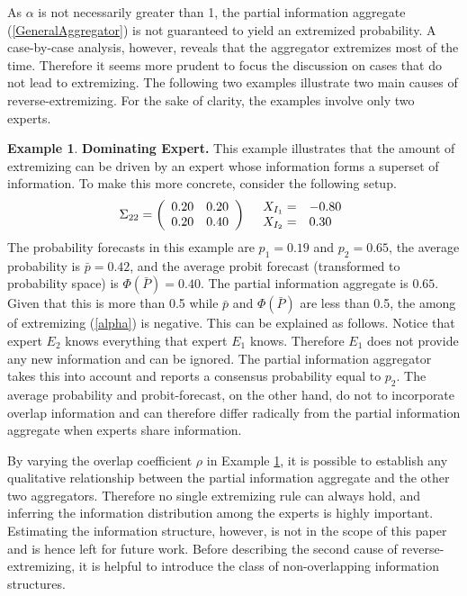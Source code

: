 \documentclass[11pt]{article}
\theoremstyle{definition}
\newtheorem{example}[theorem]{Example}
\theoremstyle{definition}
\begin{document}
As $\alpha$ is not necessarily greater than 1, the partial information aggregate (\ref{GeneralAggregator}) is not guaranteed to yield an extremized probability. A case-by-case analysis, however, reveals that the aggregator extremizes most of the time. Therefore it seems more prudent to focus the discussion on cases that do not lead to extremizing. The following two examples illustrate two main causes of reverse-extremizing. For the sake of clarity, the examples involve only two experts. 



\begin{example}
\label{Example1}
\textbf{Dominating Expert.} This example illustrates that the amount of extremizing can be driven by an expert whose information forms a superset of information. To make this more concrete, consider the following setup.
\begin{align*}
\Sigma_{22} =  \left(\begin{array}{c c}
0.20 & 0.20\\
0.20 & 0.40 \\
 \end{array}\right)
  && 
  \begin{array}{l l}
X_{I_1} =& -0.80\\
X_{I_2} =& 0.30
 \end{array}
\end{align*}
The probability forecasts in this example are $p_1 = 0.19$ and $p_2 = 0.65$, the average probability is $\bar{p} = 0.42$, and the average probit forecast (transformed to probability space) is $\Phi(\bar{P}) = 0.40$. 
The partial information aggregate is $0.65$.  Given that this is more than 0.5 while $\bar{p}$ and $\Phi(\bar{P})$ are less than 0.5, the among of extremizing (\ref{alpha}) is negative. This can be explained as follows. Notice that expert $E_2$ knows everything that expert $E_1$ knows. Therefore $E_1$ does not provide any new information and can be ignored. The partial information aggregator takes this into account and reports a consensus probability equal to $p_2$. The average probability and probit-forecast, on the other hand, do not to incorporate overlap information and can therefore differ radically from the partial information aggregate when experts share information.
\end{example}

By varying the overlap coefficient $\rho$ in Example \ref{Example1}, it is possible to establish any qualitative relationship between the partial information aggregate and the other two aggregators. Therefore no single extremizing rule can always hold, and inferring the information distribution among the experts is highly important. Estimating the information structure, however, is not in the scope of this paper and is hence left for future work. Before describing the second cause of reverse-extremizing, it is helpful to introduce the class of non-overlapping information structures. 
\end{document}
